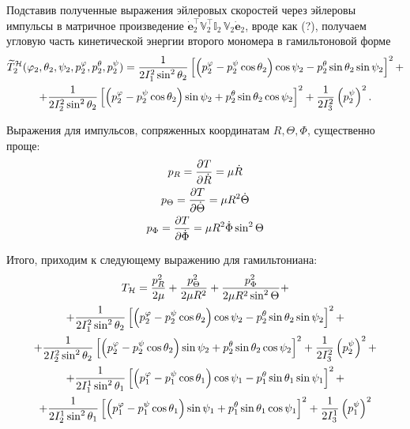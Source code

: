 \documentclass[14pt]{extarticle}
\newcommand{\dveulers}{\dot{\mathbf{e}}_2}
\newcommand{\dR}{\dot{R}}
\newcommand{\dTheta}{\dot{\Theta}}
\newcommand{\dPhi}{\dot{\Phi}}
\newcommand{\bbVs}{\mathbb{V}_2}
\newcommand{\bbIt}{\mathbb{I}_2 \,}
\newcommand{\If}{I_1^2}
\newcommand{\Is}{I_2^2}
\newcommand{\It}{I_3^2}
\newcommand{\Iff}{I_1^1}
\newcommand{\Iss}{I_2^1}
\newcommand{\Itt}{I_3^1}
\newcommand{\lb}{\left(}
\newcommand{\rb}{\right)}
\newcommand{\lsq}{\left[}
\newcommand{\rsq}{\right]}
\begin{document}
Подставив полученные выражения эйлеровых скоростей через эйлеровы импульсы в матричное произведение $\displaystyle \dveulers^\top \bbVs^\top \bbIt \bbVs \dveulers$, вроде как (?), получаем угловую часть кинетической энергии второго мономера в гамильтоновой форме
\begin{gather}
		\widetilde{T}_2^\mathcal{H} (\varphi_2, \theta_2, \psi_2, p_2^\varphi, p_2^\theta, p_2^\psi)= \frac{1}{2 \If \sin^2 \theta_2} \lsq \lb p_2^\varphi - p_2^\psi \cos \theta_2 \rb \cos \psi_2 - p_2^\theta \sin \theta_2 \sin \psi_2 \rsq^2 + \notag \\
	+ \frac{1}{2 \Is \sin^2 \theta_2} \lsq \lb p_2^\varphi - p_2^\psi \cos \theta_2 \rb \sin \psi_2 + p_2^\theta \sin \theta_2 \cos \psi_2 \rsq^2 + \frac{1}{2 \It} \lb p_2^\psi \rb^2.
\end{gather}

Выражения для импульсов, сопряженных координатам $R, \Theta, \Phi$, существенно проще:
\begin{gather}
	p_R = \frac{\partial T}{\partial \dR} = \mu \dR \notag \\
	p_\Theta = \frac{\partial T}{\partial \dTheta} = \mu R^2 \dTheta \notag \\
	p_\Phi = \frac{\partial T}{\partial \dPhi} = \mu R^2 \dPhi \sin^2 \Theta \notag
\end{gather}

Итого, приходим к следующему выражению для гамильтониана:
\begin{gather}
	T_\mathcal{H} = \frac{p_R^2}{2 \mu} + \frac{p_\Theta^2}{2 \mu R^2} + \frac{p_\Phi^2}{2 \mu R^2 \sin^2 \Theta} + \notag \\
	+ \frac{1}{2 \If \sin^2 \theta_2} \lsq \lb p_2^\varphi - p_2^\psi \cos \theta_2 \rb \cos \psi_2 - p_2^\theta \sin \theta_2 \sin \psi_2 \rsq^2 + \notag \\
	+ \frac{1}{2 \Is \sin^2 \theta_2} \lsq \lb p_2^\varphi - p_2^\psi \cos \theta_2 \rb \sin \psi_2 + p_2^\theta \sin \theta_2 \cos \psi_2 \rsq^2 + \frac{1}{2 \It} \lb p_2^\psi \rb^2 + \notag \\
	+ \frac{1}{2 \Iff \sin^2 \theta_1} \lsq \lb p_1^\varphi - p_1^\psi \cos \theta_1 \rb \cos \psi_1 - p_1^\theta \sin \theta_1 \sin \psi_1 \rsq^2 + \notag \\
	+ \frac{1}{2 \Iss \sin^2 \theta_1} \lsq \lb p_1^\varphi - p_1^\psi \cos \theta_1 \rb \sin \psi_1 + p_1^\theta \sin \theta_1 \cos \psi_1 \rsq^2 + \frac{1}{2 \Itt} \lb p_1^\psi \rb^2 \notag
\end{gather}
\end{document}
